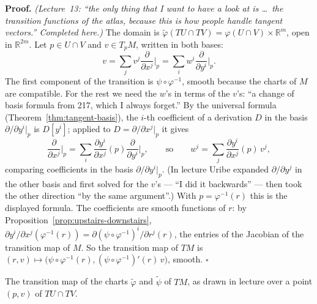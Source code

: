 \documentclass[11pt]{report}
\renewenvironment{proof}[1][Proof]{\noindent\textbf{#1.} }{\hfill$\square$\par\vspace{5pt}}
\begin{document}
\begin{proof}
\textit{(Lecture~13: ``the only thing that I want to have a look at is \ldots\ the transition functions of the atlas, because this is how people handle tangent vectors.'' Completed here.)} The domain is $\tilde\varphi(TU \cap TV) = \varphi(U \cap V) \times \mathbb{R}^m$, open in $\mathbb{R}^{2m}$. Let $p \in U \cap V$ and $v \in T_pM$, written in both bases:
\[
v = \sum_j v^j \frac{\partial}{\partial x^j}\Big|_p = \sum_i w^i \frac{\partial}{\partial y^i}\Big|_p .
\]
The first component of the transition is $\psi \circ \varphi^{-1}$, smooth because the charts of $M$ are compatible. For the rest we need the $w$'s in terms of the $v$'s: ``a change of basis formula from 217, which I always forget.'' By the universal formula (Theorem~\ref{thm:tangent-basis}), the $i$-th coefficient of a derivation $D$ in the basis $\partial/\partial y^i|_p$ is $D[y^i]$; applied to $D = \partial/\partial x^j|_p$ it gives
\[
\frac{\partial}{\partial x^j}\Big|_p = \sum_i \frac{\partial y^i}{\partial x^j}(p) \frac{\partial}{\partial y^i}\Big|_p, \qquad\text{so}\qquad w^i = \sum_j \frac{\partial y^i}{\partial x^j}(p)\, v^j ,
\]
comparing coefficients in the basis $\partial/\partial y^i|_p$. (In lecture Uribe expanded $\partial/\partial y^j$ in the other basis and first solved for the $v$'s --- ``I did it backwards'' --- then took the other direction ``by the same argument''.) With $p = \varphi^{-1}(r)$ this is the displayed formula. The coefficients are smooth functions of $r$: by Proposition~\ref{prop:upstairs-downstairs}, $\partial y^i/\partial x^j(\varphi^{-1}(r)) = \partial(\psi \circ \varphi^{-1})^i/\partial r^j(r)$, the entries of the Jacobian of the transition map of $M$. So the transition map of $TM$ is $(r, v) \mapsto \big(\psi \circ \varphi^{-1}(r), (\psi \circ \varphi^{-1})'(r)\, v\big)$, smooth.
\end{proof}

\begin{center}
\end{center}

The transition map of the charts $\tilde\varphi$ and $\tilde\psi$ of $TM$, as drawn in lecture over a point $(p, v)$ of $TU \cap TV$.
\end{document}
